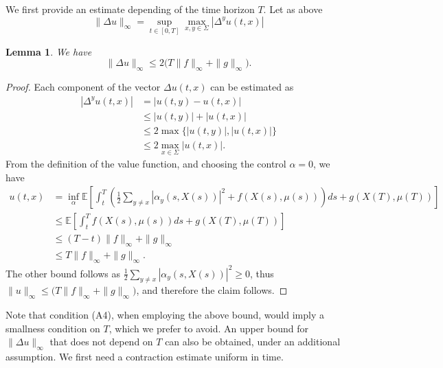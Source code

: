\documentclass[11pt,a4paper]{amsart}
\newtheorem{lemma}{Lemma}
\theoremstyle{definition}
\newcommand{\norm}[1]{\|#1\|}
\newcommand{\E}{\mathbb{E}}
\begin{document}
We first provide an estimate depending of the time horizon $T$. Let as above 
\[
\norm{\Delta u}_\infty = \sup_{t \in [0,T]} \max_{x,y \in \Sigma} |\Delta^y u(t,x)|
\] 


\begin{lemma}
   We have 
    \begin{equation}
        \norm{\Delta u}_{\infty}
        \le 2 \big( T \norm{f}_{\infty} + \norm{g}_{\infty} \big).
    \end{equation}
\end{lemma}
\begin{proof}
    Each component of the vector $\Delta u(t,x)$ can be estimated as
    \begin{align*}
        |\Delta^y u(t,x)|
        &= |u(t,y) - u(t,x)| \\
        &\le |u(t,y)| + |u(t,x)| \\
        &\le 2 \max\{|u(t,y)|, |u(t,x)|\} \\
        &\le 2 \max_{x \in \Sigma} |u(t,x)|.
    \end{align*}
    From the definition of the value function, and choosing the control $\alpha = 0$, we have
    \begin{align*}
        u(t,x)
        &= \inf_{\alpha} \E\left[\int_{t}^{T}\left(\frac{1}{2} \sum_{y \neq x} |\alpha_y(s,X(s))|^2 + f(X(s),\mu(s))\right) ds + g(X(T),\mu(T))\right] \\
        &\le \E\left[\int_{t}^{T} f(X(s),\mu(s))ds + g(X(T),\mu(T))\right] \\
        &\le (T-t)\norm{f}_{\infty} + \norm{g}_{\infty} \\
        &\le T \norm{f}_{\infty} + \norm{g}_{\infty}.
    \end{align*}
    The other bound follows as $\tfrac{1}{2} \sum_{y \neq x} |\alpha_y(s,X(s))|^2\geq 0$, thus 
    $\norm{u}_{\infty} \le  \big( T \norm{f}_{\infty} + \norm{g}_{\infty} \big)$, and therefore the claim follows. 
\end{proof}

Note that condition (A4), when employing the above bound, would imply a smallness condition on $T$, which we prefer to avoid. 
An upper bound for $\norm{\Delta u}_\infty$ that does not depend on $T$ can also be obtained, under an additional assumption. We first need a contraction estimate uniform in time. 
\end{document}
